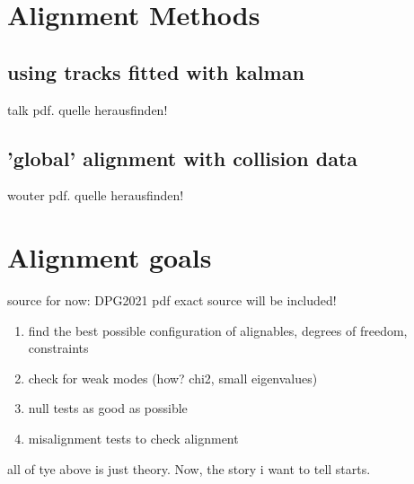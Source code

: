 \section{Alignment Methods}

\subsection{using tracks fitted with kalman}
talk pdf. quelle herausfinden!
\subsection{'global' alignment with collision data}
wouter pdf. quelle herausfinden!

\section{Alignment goals}
source for now: DPG2021 pdf exact source will be included!
\begin{enumerate}
  \item find the best possible configuration of alignables, degrees of freedom, constraints
  \item check for weak modes (how? chi2, small eigenvalues)
  \item null tests as good as possible
  \item misalignment tests to check alignment
\end{enumerate}

all of tye above is just theory. Now, the story i want to tell starts.
